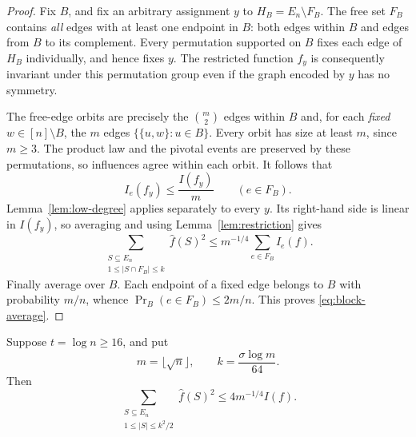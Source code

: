\begin{proof}
Fix $B$, and fix an arbitrary assignment $y$ to
$H_B=E_n\setminus F_B$.  The free set $F_B$ contains \emph{all} edges
with at least one endpoint in $B$: both edges within $B$ and edges
from $B$ to its complement.  Every permutation supported on $B$
fixes each edge of $H_B$ individually, and hence fixes $y$.
The restricted function $f_y$ is consequently invariant under this
permutation group even if the graph encoded by $y$ has no symmetry.

The free-edge orbits are precisely the $\binom m2$ edges within $B$
and, for each \emph{fixed} $w\in[n]\setminus B$, the $m$ edges
$\{\{u,w\}:u\in B\}$.  Every orbit has size at least $m$, since
$m\ge3$.  The product law and the pivotal events are preserved by
these permutations, so influences agree within each orbit.
It follows that
\[
 I_e(f_y)\le\frac{I(f_y)}m\qquad(e\in F_B).
\]
Lemma~\ref{lem:low-degree} applies separately to every $y$.  Its
right-hand side is linear in $I(f_y)$, so averaging and using
Lemma~\ref{lem:restriction} gives
\[
 \sum_{\substack{S\subseteq E_n\\1\le |S\cap F_B|\le k}}
       \widehat f(S)^2
 \le m^{-1/4}\sum_{e\in F_B}I_e(f).
\]
Finally average over $B$.  Each endpoint of a fixed edge belongs to
$B$ with probability $m/n$, whence
$\Pr_B(e\in F_B)\le2m/n$.  This proves
\eqref{eq:block-average}.
\end{proof}

\begin{lemma}
\label{lem:block-capture}
Suppose $t=\log n\ge16$, and put
\[
 m=\lfloor\sqrt n\rfloor,
 \qquad k=\frac{\sigma\log m}{64}.
\]
Then
\begin{equation}
 \sum_{\substack{S\subseteq E_n\\1\le |S|\le k^2/2}}
       \widehat f(S)^2
 \le 4m^{-1/4}I(f).
 \label{eq:captured-mass}
\end{equation}
\end{lemma}


